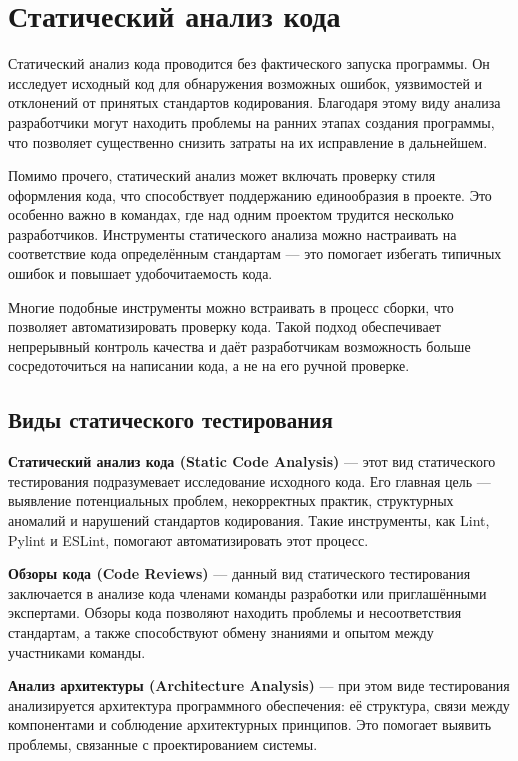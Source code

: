 \documentclass{article}[14pt]
\begin{document}
\pagebreak

\section{Статический анализ кода}

Статический анализ кода проводится без фактического запуска программы. Он исследует исходный код для обнаружения возможных ошибок, 
уязвимостей и отклонений от принятых стандартов кодирования. Благодаря этому виду анализа разработчики могут находить проблемы на ранних 
этапах создания программы, что позволяет существенно снизить затраты на их исправление в дальнейшем.

Помимо прочего, статический анализ может включать проверку стиля оформления кода, что способствует поддержанию единообразия в проекте. 
Это особенно важно в командах, где над одним проектом трудится несколько разработчиков. Инструменты статического анализа можно настраивать 
на соответствие кода определённым стандартам — это помогает избегать типичных ошибок и повышает удобочитаемость кода.

Многие подобные инструменты можно встраивать в процесс сборки, что позволяет автоматизировать проверку кода. Такой подход обеспечивает 
непрерывный контроль качества и даёт разработчикам возможность больше сосредоточиться на написании кода, а не на его ручной проверке.

\subsection*{Виды статического тестирования}

\textbf{Статический анализ кода (Static Code Analysis)} — этот вид статического тестирования подразумевает исследование исходного кода. 
Его главная цель — выявление потенциальных проблем, некорректных практик, структурных аномалий и нарушений стандартов кодирования. 
Такие инструменты, как Lint, Pylint и ESLint, помогают автоматизировать этот процесс.

\textbf{Обзоры кода (Code Reviews)} — данный вид статического тестирования заключается в анализе кода членами команды разработки или 
приглашёнными экспертами. Обзоры кода позволяют находить проблемы и несоответствия стандартам, а также способствуют обмену знаниями и 
опытом между участниками команды.

\textbf{Анализ архитектуры (Architecture Analysis)} — при этом виде тестирования анализируется архитектура программного обеспечения: её 
структура, связи между компонентами и соблюдение архитектурных принципов. Это помогает выявить проблемы, связанные с проектированием системы.
\end{document}
